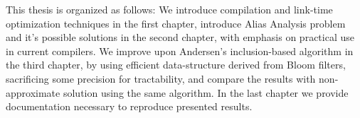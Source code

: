 This thesis is organized as follows: We introduce compilation and link-time
optimization techniques in the first chapter, introduce Alias Analysis problem
and it's possible solutions in the second chapter, with emphasis on practical
use in current compilers. We improve upon Andersen's inclusion-based algorithm
in the third chapter, by using efficient data-structure derived from Bloom
filters, sacrificing some precision for tractability, and compare the results
with non-approximate solution using the same algorithm. In the last chapter we
provide documentation necessary to reproduce presented results.



%
%
%
%
%
%
%
%
